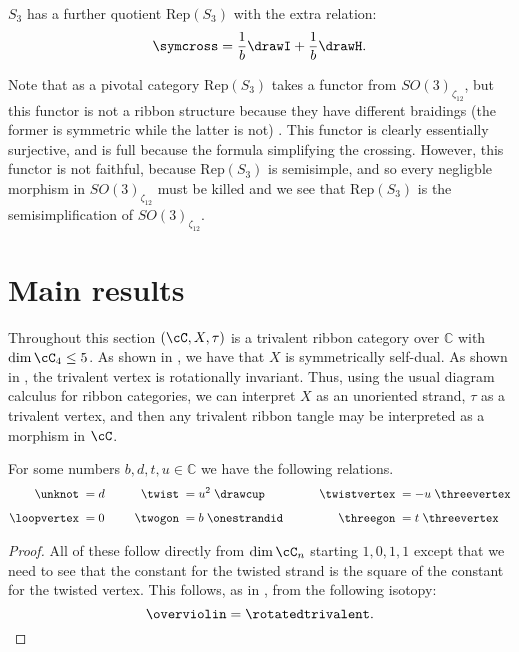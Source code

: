\documentclass[12pt]{amsart}
\begin{document}
\begin{definition}
$S_{3}$ has a further quotient $\mathrm{Rep}(S_3)$ with the extra relation:
$$\symcross = \frac{1}{b}\drawI + \frac{1}{b}\drawH.$$
\end{definition}

Note that as a pivotal category $\mathrm{Rep}(S_3)$ takes a functor from $SO(3)_{\zeta_{12}}$, but this functor is not a ribbon structure because they have different braidings (the former is symmetric while the latter is not) \cite[Ex. 8.6]{MR3624901}.  This functor is clearly essentially surjective, and is full because the formula simplifying the crossing.  However, this functor is not faithful, because $\mathrm{Rep}(S_3)$ is semisimple, and so every negligble morphism in $SO(3)_{\zeta_{12}}$ must be killed and we see that $\mathrm{Rep}(S_3)$ is the semisimplification of $SO(3)_{\zeta_{12}}$.

\section{Main results}

Throughout this section $(\cC, X, \tau)$ is a trivalent ribbon category over
$\mathbb{C}$ with $\dim{\cC_4} \leq 5$.  As shown in \cite[Lemma
2.2]{MR3624901}, we have that $X$ is symmetrically self-dual.  As shown in
\cite[Lemma 8.2]{MR3624901}, the trivalent vertex is rotationally invariant.
Thus, using the usual diagram calculus for ribbon categories, we can interpret
$X$ as an unoriented strand, $\tau$ as a trivalent vertex, and then any
trivalent ribbon tangle may be interpreted as a morphism in $\cC$.

\begin{lemma} \label{lem:constants}
  For some numbers $b, d, t, u \in \mathbb{C}$ we have the following relations.
  \begin{equation}
    \label{eq:simple-rels}
  \begin{aligned}
    \unknot\; &= d&\qquad
      \twist\; &= u^2\;\drawcup&\qquad
        \twistvertex\; &= -u\;\threevertex\\[5pt]
    \loopvertex\;&=0&
      \twogon\;&= b\;\onestrandid&
        \threegon\; &= t\;\threevertex
  \end{aligned}
  \end{equation}
\end{lemma}

\begin{proof}
All of these follow directly from $\dim \cC_n$ starting $1,0,1,1$ except that
we need to see that the constant for the twisted strand is the square of the
constant for the twisted vertex.  This follows, as in
\cite[Lemma~8.2]{MR3624901}, from the following isotopy:
\begin{equation*}
\overviolin = \rotatedtrivalent. \qedhere
\end{equation*}
\end{proof}
\end{document}
